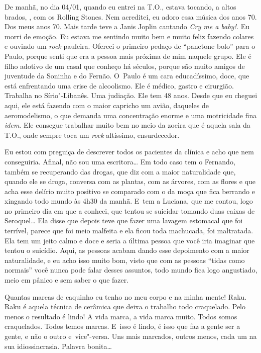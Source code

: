 De manhã, no dia 04/01, quando eu entrei na T.O., estava tocando, a
altos brados, \emph{}, com os Rolling Stones. Nem acreditei,
eu adoro essa música dos anos 70. Dos meus anos 70. Mais tarde teve a
Janis Joplin cantando \emph{Cry me a baby!.} Eu morri de emoção. Eu
estava me sentindo muito bem e muito feliz fazendo colares e ouvindo um
\emph{rock} pauleira. Ofereci o primeiro pedaço de ``panetone bolo''
para o Paulo, porque senti que era a pessoa mais próxima de mim naquele
grupo. Ele é filho adotivo de um casal que conheço há séculos, porque
são muito amigos de juventude da Soninha e do Fernão. O~Paulo é um
cara educadíssimo, doce, que está enfrentando uma crise de alcoolismo.
Ele é médico, gastro e cirurgião. Trabalha no Sírio"-Libanês. Uma
judiação. Ele tem 48 anos. Desde que eu cheguei aqui, ele está fazendo
com o maior capricho um avião, daqueles de aeromodelismo, o que demanda
uma concentração enorme e uma motricidade fina \emph{idem}. Ele consegue
trabalhar muito bem no meio da zoeira que é aquela sala da T.O., onde
sempre toca um \emph{rock} altíssimo, ensurdecedor.

Eu estou com preguiça de descrever todos os pacientes da clínica e acho
que nem conseguiria. Afinal, não sou uma escritora… Em todo caso
tem o Fernando, também se recuperando das drogas, que diz com a maior
naturalidade que, quando ele se droga, conversa com as plantas, com as
árvores, com as flores e que acha esse delírio muito positivo se
comparado com o da moça que fica berrando e xingando todo mundo às 4h30
da manhã. E~tem a Luciana, que me contou, logo no primeiro dia em que a
conheci, que tentou se suicidar tomando duas caixas de Seroquel…
Ela disse que depois teve que fazer uma lavagem estomacal que foi
terrível, parece que foi meio malfeita e ela ficou toda machucada, foi
maltratada. Ela tem um jeito calmo e doce e seria a última pessoa que
você iria imaginar que tentou o suicídio. Aqui, as pessoas acabam dando
esse depoimento com a maior naturalidade, e eu acho isso muito bom,
visto que com as pessoas ``tidas como normais'' você nunca pode falar
desses assuntos, todo mundo fica logo angustiado, meio em pânico e sem
saber o que fazer.

Quantas marcas de caquinho eu tenho no meu corpo e na minha mente! Raku.
Raku é aquela técnica de cerâmica que deixa o trabalho todo craquelado.
Pelo menos o resultado é lindo! A vida marca, a vida marca muito. Todos
somos craquelados. Todos temos marcas. E~isso é lindo, é isso que faz a
gente ser a gente, e não o outro e~vice"-versa. Uns mais marcados,
outros menos, cada um na sua idiossincrasia. Palavra bonita…

